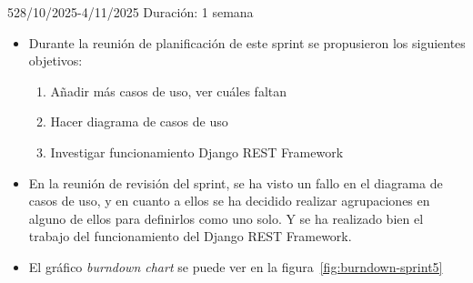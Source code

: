 \begin{Sprint}{5}{28/10/2025-4/11/2025}
	Duración: 1 semana
	\begin{itemize}	
		\item{}
		Durante la reunión de planificación de este sprint se propusieron los siguientes objetivos:
		\begin{enumerate}
			\item Añadir más casos de uso, ver cuáles faltan
			\item Hacer diagrama de casos de uso
			\item Investigar funcionamiento Django REST Framework
		\end{enumerate}
		\item{}
		En la reunión de revisión del sprint, se ha visto un fallo en el diagrama de casos de uso, y en cuanto a ellos se ha decidido realizar agrupaciones en alguno de ellos para definirlos como uno solo. Y se ha realizado bien el trabajo del funcionamiento del Django REST Framework.
		\item{}
		El gráfico \textit{burndown chart} se puede ver en la figura~\ref{fig:burndown-sprint5}
	\end{itemize}
\end{Sprint}

